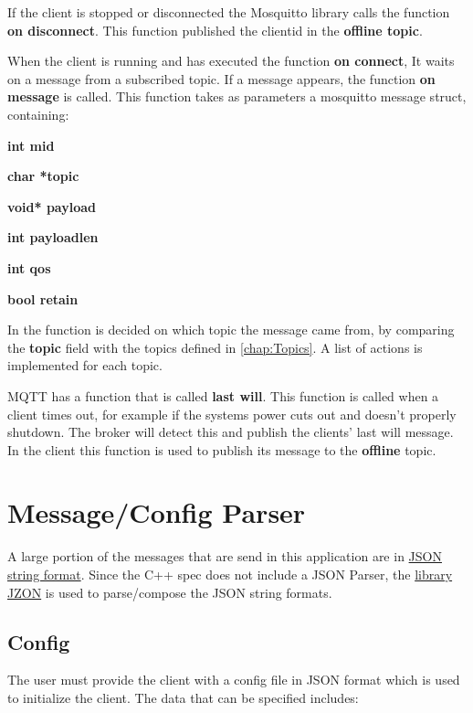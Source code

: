If the client is stopped or disconnected the Mosquitto library calls the function \textbf{on disconnect}.
This function published the clientid in the \textbf{offline topic}.

When the client is running and has executed the function \textbf{on connect},
It waits on a message from a subscribed topic.
If a message appears, the function \textbf{on message} is called.
This function takes as parameters a mosquitto message struct, containing:

\begin{shortlist}
	\item \textbf{int mid}
	\item \textbf{char *topic}
	\item \textbf{void* payload}
	\item \textbf{int payloadlen}
	\item \textbf{int qos}
	\item \textbf{bool retain}
\end{shortlist}

In the function is decided on which topic the message came from,
by comparing the \textbf{topic} field with the topics defined in \ref{chap:Topics}.
A list of actions is implemented for each topic.

MQTT has a function that is called \textbf{last will}.
This function is called when a client times out, for example if the systems power cuts out and doesn't properly shutdown.
The broker will detect this and publish the clients' last will message.
In the client this function is used to publish its message to the \textbf{offline} topic.

\section{Message/Config Parser}

A large portion of the messages that are send in this application are in \href{http://www.json.org/}{JSON string format}.
Since the C++ spec does not include a JSON Parser, the \href{https://github.com/Zguy/Jzon}{library JZON} is used to parse/compose the JSON string formats.

\subsection{Config}
The user must provide the client with a config file in JSON format which is used to initialize the client. The data that can be specified includes:

